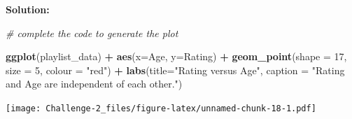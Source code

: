 \documentclass[
]{article}
\newenvironment{Shaded}{\begin{snugshade}}{\end{snugshade}}
\newcommand{\AttributeTok}[1]{\textcolor[rgb]{0.13,0.29,0.53}{#1}}
\newcommand{\CommentTok}[1]{\textcolor[rgb]{0.56,0.35,0.01}{\textit{#1}}}
\newcommand{\DecValTok}[1]{\textcolor[rgb]{0.00,0.00,0.81}{#1}}
\newcommand{\FunctionTok}[1]{\textcolor[rgb]{0.13,0.29,0.53}{\textbf{#1}}}
\newcommand{\NormalTok}[1]{#1}
\newcommand{\SpecialCharTok}[1]{\textcolor[rgb]{0.81,0.36,0.00}{\textbf{#1}}}
\newcommand{\StringTok}[1]{\textcolor[rgb]{0.31,0.60,0.02}{#1}}
\begin{document}
\textbf{Solution:}

\begin{Shaded}
\begin{Highlighting}[]
\CommentTok{\# complete the code to generate the plot}

\FunctionTok{ggplot}\NormalTok{(playlist\_data) }\SpecialCharTok{+} \FunctionTok{aes}\NormalTok{(}\AttributeTok{x=}\NormalTok{Age, }\AttributeTok{y=}\NormalTok{Rating) }\SpecialCharTok{+} \FunctionTok{geom\_point}\NormalTok{(}\AttributeTok{shape =} \DecValTok{17}\NormalTok{, }\AttributeTok{size =} \DecValTok{5}\NormalTok{, }\AttributeTok{colour =} \StringTok{"red"}\NormalTok{) }\SpecialCharTok{+}
\FunctionTok{labs}\NormalTok{(}\AttributeTok{title=}\StringTok{"Rating versus Age"}\NormalTok{, }\AttributeTok{caption =} \StringTok{"Rating and Age are independent of each other."}\NormalTok{)}
\end{Highlighting}
\end{Shaded}

\texttt{[image: Challenge-2\_files/figure-latex/unnamed-chunk-18-1.pdf]}
\end{document}
